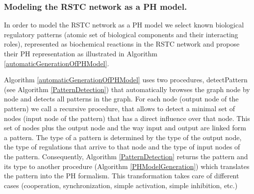 \subsubsection{Modeling the RSTC network as a PH model.}



In order to model the RSTC network as a PH model we select known biological regulatory patterns (atomic set of biological components and their interacting roles), represented 
as biochemical reactions in the RSTC network and propose their PH representation as illustrated in Algorithm \ref{automaticGenerationOfPHModel}. 

Algorithm \ref{automaticGenerationOfPHModel} uses two procedures, detectPattern (see Algorithm \ref{PatternDetection}) that automatically browses the graph node by node and detects all patterns in the graph. For each node (output node of the pattern) we  call a recursive procedure,
that  allows  to detect a minimal set of nodes (input node of the pattern) that has a direct influence over that node. This set of nodes plus the output node and the way  input and output are linked form a pattern. 
The type of a pattern is determined by the type of the output node, the type of regulations that arrive to that node and the type of input nodes of the pattern. Consequently, Algorithm \ref{PatternDetection} returns the pattern 
and its type to another procedure (Algorithm \ref{PHModelGeneration}) which  translates the pattern into the PH formalism. This transformation  takes care of different cases (cooperation, synchronization, simple activation, simple inhibition, etc.)




